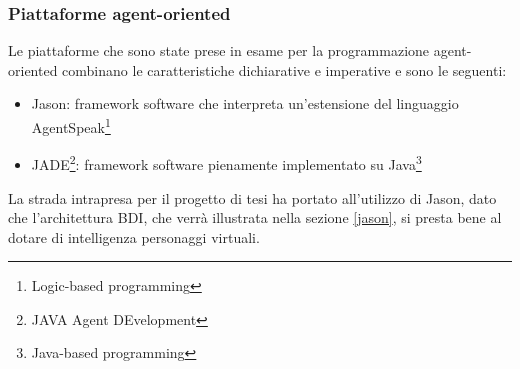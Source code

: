 \subsubsection{Piattaforme agent-oriented}

Le piattaforme che sono state prese in esame per la programmazione agent-oriented combinano le caratteristiche dichiarative e imperative e sono le seguenti:

\begin{itemize}
    \item Jason: framework software che interpreta un'estensione del linguaggio AgentSpeak\footnote{Logic-based programming} \cite{jason-book}
    \item JADE\footnote{JAVA Agent DEvelopment}: framework software pienamente implementato su Java\footnote{Java-based programming} \cite{jade-book}
\end{itemize}

La strada intrapresa per il progetto di tesi ha portato all'utilizzo di Jason, dato che l'architettura BDI, che verrà illustrata nella sezione \ref{jason}, si presta bene al dotare di intelligenza personaggi virtuali.



